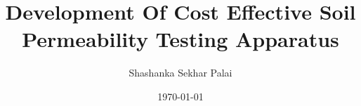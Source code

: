 \documentclass[a4paper, 11pt, oneside, openright]{iterthesis}
\title{Development Of Cost Effective Soil Permeability Testing Apparatus}
\author{Shashanka Sekhar Palai}
\date{\today}
\begin{document}
\maketitle


\makeapproval

\makecertificate

\acknowledgments

\endacknowledgments

\makedeclaration

\abstract

\endabstract

\tableofcontents

\listoftables

\listoffigures












\end{document}
